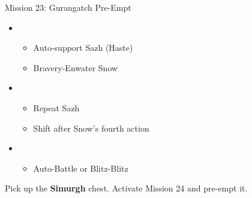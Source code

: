 	\begin{battle}[0:22]{Mission 23: Gurangatch Pre-Empt}
		\begin{itemize}
			\item \third
			      \begin{itemize}
				      \item Auto-support Sazh (Haste)
				      \item Bravery-Enwater Snow
			      \end{itemize}
			\item \first
			      \begin{itemize}
				      \item Repeat Sazh
				      \item Shift after Snow's fourth action
			      \end{itemize}
			\item \fourth
			      \begin{itemize}
				      \item Auto-Battle or Blitz-Blitz
			      \end{itemize}
		\end{itemize}
	\end{battle}

Pick up the \textbf{Simurgh} chest.
Activate Mission 24 and pre-empt it.

